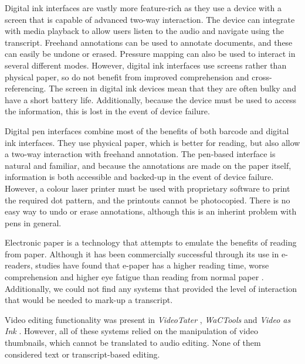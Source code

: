 Digital ink interfaces are vastly more feature-rich as they use a device with a screen that is capable of advanced
two-way interaction. The device can integrate with media playback to allow users listen to the audio and navigate using
the transcript. Freehand annotations can be used to annotate documents, and these can easily be undone or erased.
Pressure mapping can also be used to interact in several different modes.  However, digital ink interfaces use screens
rather than physical paper, so do not benefit from improved comprehension and cross-referencing. The screen in digital
ink devices mean that they are often bulky and have a short battery life. Additionally, because the device must be used
to access the information, this is lost in the event of device failure.

Digital pen interfaces combine most of the benefits of both barcode and digital ink interfaces. They use physical
paper, which is better for reading, but also allow a two-way interaction with freehand annotation. The pen-based
interface is natural and familiar, and because the annotations are made on the paper itself, information is both
accessible and backed-up in the event of device failure. However, a colour laser printer must be used with proprietary
software to print the required dot pattern, and the printouts cannot be photocopied. There is no easy way to undo or
erase annotations, although this is an inherint problem with pens in general.

Electronic paper is a technology that attempts to emulate the benefits of reading from paper. Although it has been
commercially successful through its use in e-readers, studies have found that e-paper has a higher reading time, worse
comprehension and higher eye fatigue than reading from normal paper \citep{Jeong2012, Daniel2013}.
Additionally, we could not find any systems that provided the level of interaction that would be needed to mark-up a
transcript.


Video editing functionality was present in \textit{VideoTater} \citep{Diakopoulos2006}, \textit{WaCTools}
\citep{Cattelan2008} and \textit{Video as Ink} \citep{Cabral2016}. However, all of these systems relied on the
manipulation of video thumbnails, which cannot be translated to audio editing. None of them considered text or
transcript-based editing.

